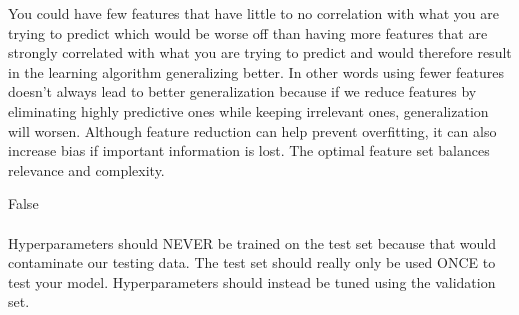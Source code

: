 \documentclass{article}
\begin{document}
\begin{aprob}
\begin{tcolorbox}[colback=lightgray!10!white, colframe=black, title=A1.c]
        You could have few features that have little to no correlation with what you are trying to predict
        which would be worse off than having more features that are strongly correlated with what you are trying 
        to predict and would therefore result in the learning algorithm generalizing better. In other words using fewer features
        doesn't always lead to better generalization because if we reduce features by eliminating highly predictive ones while
        keeping irrelevant ones, generalization will worsen. Although feature reduction can help prevent overfitting, it can also
        increase bias if important information is lost. The optimal feature set balances relevance and complexity.
    \end{tcolorbox}
    \begin{tcolorbox}[colback=lightgray!10!white, colframe=black, title=A1.d]
        False \\\\
        Hyperparameters should NEVER be trained on the test set because that would contaminate
        our testing data. The test set should really only be used ONCE to test your model. Hyperparameters
        should instead be tuned using the validation set. \\
        

\end{tcolorbox}
\end{aprob}
\end{document}
